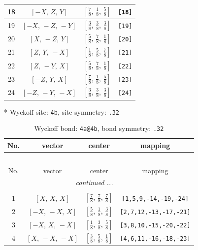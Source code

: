 \documentclass[fleqn,8pt]{jsarticle}
\begin{document}
\begin{longtable}{cccc}
18 & $\left[ - X,\, Z,\, Y \right]$ & $\left[ \frac{7}{8},\, \frac{1}{8},\, \frac{5}{8} \right]$ & {\tt [18]} \\ \hline
19 & $\left[ - X,\, - Z,\, - Y \right]$ & $\left[ \frac{3}{8},\, \frac{3}{8},\, \frac{3}{8} \right]$ & {\tt [19]} \\ \hline
20 & $\left[ X,\, - Z,\, Y \right]$ & $\left[ \frac{5}{8},\, \frac{7}{8},\, \frac{1}{8} \right]$ & {\tt [20]} \\ \hline
21 & $\left[ Z,\, Y,\, - X \right]$ & $\left[ \frac{1}{8},\, \frac{5}{8},\, \frac{7}{8} \right]$ & {\tt [21]} \\ \hline
22 & $\left[ Z,\, - Y,\, X \right]$ & $\left[ \frac{5}{8},\, \frac{7}{8},\, \frac{1}{8} \right]$ & {\tt [22]} \\ \hline
23 & $\left[ - Z,\, Y,\, X \right]$ & $\left[ \frac{7}{8},\, \frac{1}{8},\, \frac{5}{8} \right]$ & {\tt [23]} \\ \hline
24 & $\left[ - Z,\, - Y,\, - X \right]$ & $\left[ \frac{3}{8},\, \frac{3}{8},\, \frac{3}{8} \right]$ & {\tt [24]} \\
\end{longtable}
* Wyckoff site: {\tt 4b}, site symmetry: {\tt .32}
\renewcommand{\arraystretch}{1.2}
\begin{longtable}{cccc}
\caption{Wyckoff bond: {\tt 4a@4b}, bond symmetry: {\tt .32}}
 \\
 \hline \hline
No. & vector & center & mapping \\ \hline \endfirsthead

\multicolumn{3}{l}{\tablename\ \thetable{}} \\
 \hline \hline
No. & vector & center & mapping \\ \hline \endhead

 \hline \hline
\multicolumn{3}{r}{\footnotesize\it continued ...} \\ \endfoot

 \hline \hline
\multicolumn{3}{r}{} \\ \endlastfoot

1 & $\left[ X,\, X,\, X \right]$ & $\left[ \frac{7}{8},\, \frac{7}{8},\, \frac{7}{8} \right]$ & {\tt [1,5,9,-14,-19,-24]} \\ \hline
2 & $\left[ - X,\, - X,\, X \right]$ & $\left[ \frac{5}{8},\, \frac{1}{8},\, \frac{3}{8} \right]$ & {\tt [2,7,12,-13,-17,-21]} \\ \hline
3 & $\left[ - X,\, X,\, - X \right]$ & $\left[ \frac{1}{8},\, \frac{3}{8},\, \frac{5}{8} \right]$ & {\tt [3,8,10,-15,-20,-22]} \\ \hline
4 & $\left[ X,\, - X,\, - X \right]$ & $\left[ \frac{3}{8},\, \frac{5}{8},\, \frac{1}{8} \right]$ & {\tt [4,6,11,-16,-18,-23]} \\
\end{longtable}
\end{document}
